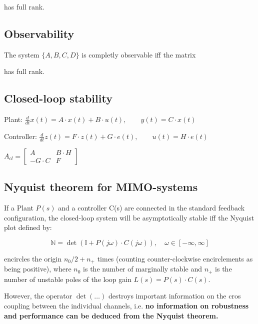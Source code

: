 \documentclass[10pt,a4paper]{scrartcl}
\begin{document}
\begin{multicols*}{3}
	has full rank.
	
	\subsection{Observability}
	
	The system $\{A,B,C,D\}$ is completly observable iff the matrix
	
	
	has full rank.
	
	\subsection{Closed-loop stability}
	
	Plant: $\frac{d}{dt}x(t)=A\cdot x(t)+B\cdot u(t),\qquad y(t)=C\cdot x(t)$
	
	
	Controller: $\frac{d}{dt}z(t)=F\cdot z(t)+G\cdot e(t),\qquad u(t)=H\cdot e(t)$
	
	
	
	$A_{cl}=\begin{bmatrix}A&B\cdot H\\-G\cdot C&F\end{bmatrix}$
	
	\subsection{Nyquist theorem for MIMO-systems}
	
	If a Plant $P(s)$ and a controller C(s) are connected in the standard feedback configuration, the closed-loop system will be asymptotically stable iff the Nyquist plot defined by:
	
	\[\mathbb{N}=\det(\mathbb{I}+P(j\omega)\cdot C(j\omega)),\quad \omega\in[-\infty,\infty]\]
	
	encircles the origin $n_0/2+n_+$ times (counting counter-clockwise encirclements as being positive), where $n_0$ is the number of marginally stable and $n_+$ is the number of unstable poles of the loop gain $L(s)=P(s)\cdot C(s)$.
	
	However, the operator $\det(\ldots)$ destroys important information on the cros coupling between the individual channels, i.e. \textbf{no information on robustness and performance can be deduced from the Nyquist theorem.}
	

\end{multicols*}
\end{document}
